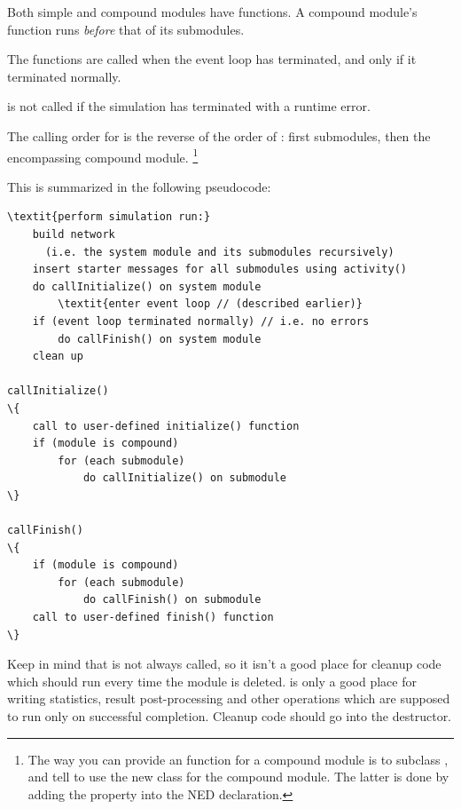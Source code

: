 Both simple and compound modules have  functions. A
compound module's  function runs \textit{before} that of
its submodules.

The  functions are called when the event loop
has terminated, and only if it terminated normally.

\begin{note}
 is not called if the simulation has terminated
with a runtime error.
\end{note}

The calling order for  is the reverse of the order of
: first submodules, then the encompassing compound module.
  \footnote{The way you can provide an  function
  for a compound module is to subclass , and tell
  {\opp} to use the new class for the compound module. The latter is done
  by adding the  property into the NED declaration.}

This is summarized in the following pseudocode:


\begin{Verbatim}[commandchars=\\\{\}]
\textit{perform simulation run:}
    build network
      (i.e. the system module and its submodules recursively)
    insert starter messages for all submodules using activity()
    do callInitialize() on system module
        \textit{enter event loop // (described earlier)}
    if (event loop terminated normally) // i.e. no errors
        do callFinish() on system module
    clean up

callInitialize()
\{
    call to user-defined initialize() function
    if (module is compound)
        for (each submodule)
            do callInitialize() on submodule
\}

callFinish()
\{
    if (module is compound)
        for (each submodule)
            do callFinish() on submodule
    call to user-defined finish() function
\}
\end{Verbatim}

Keep in mind that  is not always called, so it isn't a
good place for cleanup code which should run every time the module is
deleted.  is only a good place for writing statistics,
result post-processing and other operations  which are supposed to run only on
successful completion. Cleanup code should go into the
destructor.


